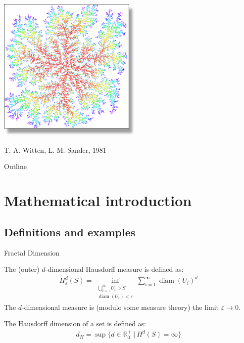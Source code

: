 \documentclass[smaller]{beamer}
\begin{document}
\begin{frame}
\begin{center}
            {
                \includegraphics[width=7cm]{img/intro_05.png}

                \color{gray}T. A. Witten, L. M. Sander, 1981
            }
        \end{center}
    \end{frame}

    \begin{frame}{Outline}
        \tableofcontents
    \end{frame}

    \section{Mathematical introduction}
        \subsection{Definitions and examples}
                \begin{frame}{Fractal Dimension}
                    \begin{definition}
                      The (outer) $d$-dimensional Hausdorff measure is defined as:
                      \begin{align}
                        H^d_\varepsilon(S)=
                        \inf_{\substack{\bigcup_{i=1}^\infty U_i\supset S\\ \operatorname{diam}(U_i) <
                        \varepsilon}}
                            \sum_{i=1}^\infty \operatorname{diam}(U_i)^d
                      \end{align}
                      The $d$-dimensional measure is (modulo some measure theory) the limit
                      $\varepsilon \to 0$. \pause
                    \end{definition}

                      \begin{definition}
                        The Hausdorff dimension of a set is defined as:
                        \begin{align}
                          d_H = \sup\{d\in\mathbb{R}^+_0\ |\ H^d(S) = \infty\}
                        \end{align}
                      \end{definition}
                \end{frame}
\end{document}
